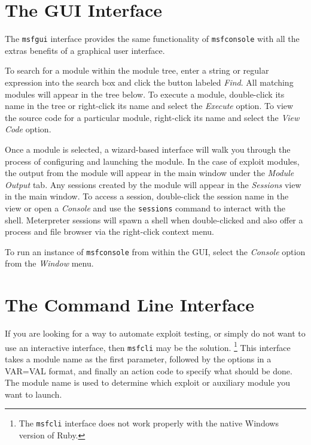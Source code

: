 \documentclass{report}
\begin{document}
    \section{The GUI Interface}
    \label{STARTED-GUI}

\par
The \texttt{msfgui} interface provides the same functionality of
\texttt{msfconsole} with all the extras benefits of a graphical user interface.

\par
To search for a module within the module tree, enter a string or regular
expression into the search box and click the button labeled \textit{Find}. All
matching modules will appear in the tree below. To execute a module,
double-click its name in the tree or right-click its name and select the
\textit{Execute} option. To view the source code for a particular module,
right-click its name and select the \textit{View Code} option.

\par
Once a module is selected, a wizard-based interface will walk you through the
process of configuring and launching the module. In the case of exploit modules,
the output from the module will appear in the main window under the
\textit{Module Output} tab. Any sessions created by the module will appear in
the \textit{Sessions} view in the main window. To access a session, double-click
the session name in the view or open a \textit{Console} and use the
\texttt{sessions} command to interact with the shell. Meterpreter sessions will
spawn a shell when double-clicked and also offer a process and file browser via
the right-click context menu.

\par
To run an instance of \texttt{msfconsole} from within the GUI, select the
\textit{Console} option from the \textit{Window} menu.

    \section{The Command Line Interface}
    \label{STARTED-CLI}

\par
If you are looking for a way to automate exploit testing, or simply do not want
to use an interactive interface, then \texttt{msfcli} may be the solution.
\footnote{The \texttt{msfcli} interface does not work properly with the native
Windows version of Ruby.} This interface takes a module name as the first
parameter, followed by the options in a VAR=VAL format, and finally an action
code to specify what should be done. The module name is used to determine which
exploit or auxiliary module you want to launch.
\end{document}
